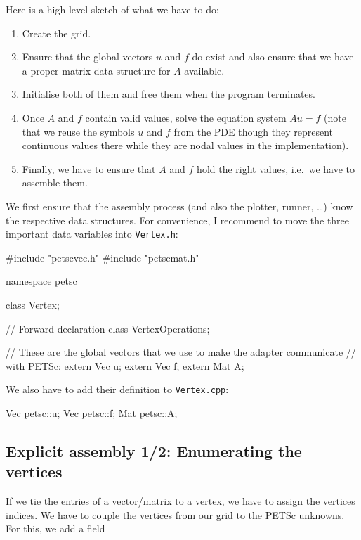 Here is a high level sketch of what we have to do:
\begin{enumerate}
  \item Create the grid.
  \item Ensure that the global vectors $u$ and $f$ do exist and also ensure that
  we have a proper matrix data structure for $A$ available.
  \item Initialise both of them and free them when the program terminates.
  \item Once $A$ and $f$ contain valid values, solve the equation system $Au=f$
  (note that we reuse the symbols $u$ and $f$ from the PDE though they
  represent continuous values there while they are nodal values in the
  implementation).
  \item Finally, we have to ensure that $A$ and $f$ hold the right values,
  i.e.~we have to assemble them.
\end{enumerate}

\noindent
We first ensure that the assembly process (and also the plotter, runner, \ldots)
know the respective data structures.
For convenience, I recommend to move the three important data variables
into \texttt{Vertex.h}:

\begin{code}
#include "petscvec.h"
#include "petscmat.h"


namespace petsc { 
  class Vertex;
      
  // Forward declaration
  class VertexOperations;

  // These are the global vectors that we use to make the adapter communicate
  // with PETSc:
  extern Vec  u;
  extern Vec  f;
  extern Mat  A;
}
\end{code}

\noindent
We also have to add their definition
to \texttt{Vertex.cpp}:

\begin{code}
Vec  petsc::u;
Vec  petsc::f;
Mat  petsc::A;
\end{code}


\subsection{Explicit assembly 1/2: Enumerating the vertices}

If we tie the entries of a vector/matrix to a vertex, we have to assign the
vertices indices.
We have to couple the vertices from our grid to the PETSc unknowns.
For this, we add a field     

